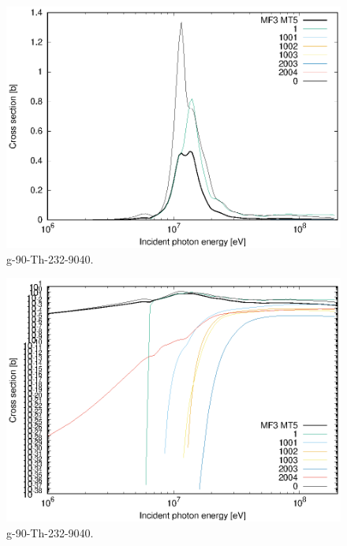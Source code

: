 \begin{figure}
 \includegraphics[width=\linewidth]{eps/g_90-Th-232_9040.eps}
  \caption{g-90-Th-232-9040.}
\end{figure}
\begin{figure}
 \includegraphics[width=\linewidth]{eps-log/g_90-Th-232_9040.eps}
 \caption{g-90-Th-232-9040.}
\end{figure}
\newpage \clearpage

